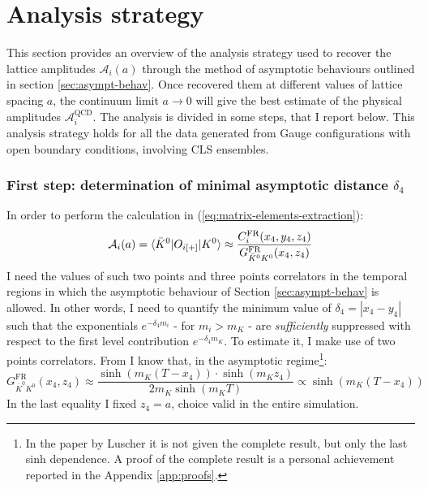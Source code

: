 \documentclass[english, LaM, oneside, noexaminfo]{sapthesis}
\newcommand{\la}{\langle}
\newcommand{\ra}{\rangle}
\begin{document}
\section{Analysis strategy}
\noindent
This section provides an overview of the analysis strategy used to recover the lattice amplitudes $\mathcal{A}_i (a)$ through the method of asymptotic behaviours outlined in section \ref{sec:asympt-behav}.
Once recovered them at different values of lattice spacing $a$, the continuum limit $a\rightarrow 0$ will give the best estimate of the physical amplitudes $\mathcal{A}_i^\text{QCD}$.
The analysis is divided in some steps, that I report below.
This analysis strategy holds for all the data generated from Gauge configurations with open boundary conditions, involving CLS ensembles.

\subsubsection*{First step: determination of minimal asymptotic distance $\delta_4$}
\noindent
In order to perform the calculation in (\ref{eq:matrix-elements-extraction}):
\begin{equation*}
    \mathcal{A}_i (a) = \la \bar K^0 | O_{i[+]} | K^0 \ra \approx \frac{C_i^\text{FR} (x_4,y_4,z_4)}{G_{\bar K^0 K^0}^\text{FR}(x_4,z_4)} \\
\end{equation*}
I need the values of such two points and three points correlators in the temporal regions in which the asymptotic behaviour of Section \ref{sec:asympt-behav} is allowed.
In other words, I need to quantify the minimum value of $\delta_4 = |x_4-y_4|$ such that the exponentials $e^{-\delta_4 m_i}$ - for $m_i > m_K$ - are {\it sufficiently} suppressed with respect to the first level contribution $e^{-\delta_4 m_K}$.
To estimate it, I make use of two points correlators.
From \cite{OBC-tm} I know that, in the asymptotic regime\footnote{In the paper \cite{OBC-tm} by Luscher it is not given the complete result, but only the last sinh dependence. A proof of the complete result is a personal achievement reported in the Appendix \ref{app:proofs}.}:
\begin{equation}\label{eq:sinh}
    G_{\bar K^0 K^0}^\text{FR}(x_4,z_4) \approx \frac{\sinh \left( m_K (T - x_4) \right) \cdot \sinh \left( m_K z_4 \right)}{2 m_K \sinh \left( m_K T \right)} \propto \sinh \left( m_K (T - x_4) \right)
\end{equation}
In the last equality I fixed $z_4 = a$, choice valid in the entire simulation.
\end{document}

